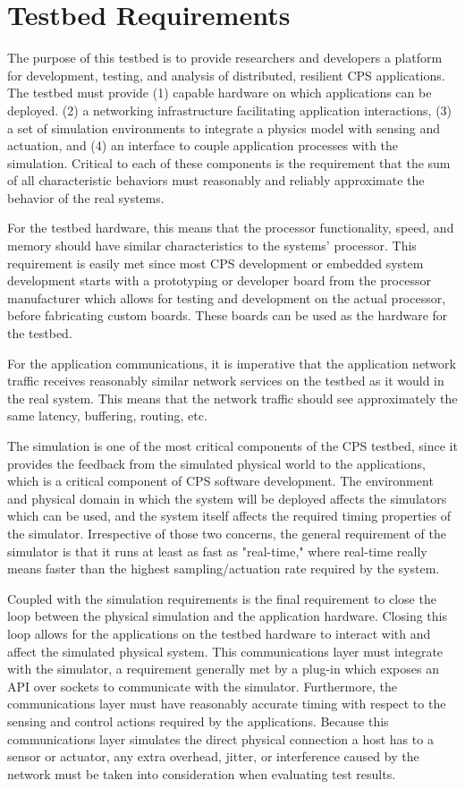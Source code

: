 \section{Testbed Requirements}
\label{sec:Requirements}

The purpose of this testbed is to provide researchers and developers a platform for development, testing, and analysis of distributed, resilient CPS applications. The testbed must provide (1) capable hardware on which applications can be deployed. (2) a networking infrastructure facilitating application interactions, (3) a set of simulation environments to integrate a physics model with sensing and actuation, and (4) an interface to couple application processes with the simulation. Critical to each of these components is the requirement that the sum of all characteristic behaviors must reasonably and reliably approximate the behavior of the real systems.

For the testbed hardware, this means that the processor functionality, speed, and memory should have similar characteristics to the systems' processor.  This requirement is easily met since most CPS development or embedded system development starts with a prototyping or developer board from the processor manufacturer which allows for testing and development on the actual processor, before fabricating custom boards. These boards can be used as the hardware for the testbed.

For the application communications, it is imperative that the application network traffic receives reasonably similar network services on the testbed as it would in the real system.  This means that the network traffic should see approximately the same latency, buffering, routing, etc.

The simulation is one of the most critical components of the CPS testbed, since it provides the feedback from the simulated physical world to the applications, which is a critical component of CPS software development.  The environment and physical domain in which the system will be deployed affects the simulators which can be used, and the system itself affects the required timing properties of the simulator.  Irrespective of those two concerns, the general requirement of the simulator is that it runs at least as fast as "real-time," where real-time really means faster than the highest sampling/actuation rate required by the system.

Coupled with the simulation requirements is the final requirement to close the loop between the physical simulation and the application hardware.  Closing this loop allows for the applications on the testbed hardware to interact with and affect the simulated physical system.  This communications layer must integrate with the simulator, a requirement generally met by a plug-in which exposes an API over sockets to communicate with the simulator.  Furthermore, the communications layer must have reasonably accurate timing with respect to the sensing and control actions required by the applications.  Because this communications layer simulates the direct physical connection a host has to a sensor or actuator, any extra overhead, jitter, or interference caused by the network must be taken into consideration when evaluating test results.  